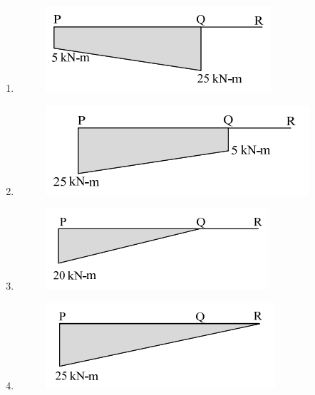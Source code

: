 \documentclass[12pt]{article}
\begin{document}
\begin{enumerate}
\begin{multicols}{2}
\begin{enumerate}

\item \begin{figure}[H]
    \centering
    \includegraphics[width=0.8\columnwidth]{figs/ass3_d_q18_a.png}
    \caption{}
    \label{fig:placeholder}
\end{figure}

\item \begin{figure}[H]
    \centering
    \includegraphics[width=0.8\columnwidth]{figs/ass3_d_q18_b.png}
    \caption{}
    \label{fig:placeholder}
\end{figure}

\item \begin{figure}[H]
    \centering
    \includegraphics[width=0.8\columnwidth]{figs/ass3_d_q18_c.png}
    \caption{}
    \label{fig:placeholder}
\end{figure}

\item \begin{figure}[H]
    \centering
    \includegraphics[width=0.8\columnwidth]{figs/ass3_d_q18_d.png}
    \caption{}
    \label{fig:placeholder}
\end{figure}
\end{enumerate}
    

\end{multicols}
\end{enumerate}
\end{document}
